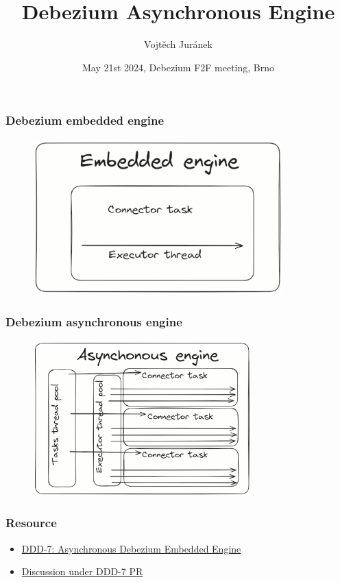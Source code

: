 \documentclass[10pt,utf8]{beamer}
\title{Debezium Asynchronous Engine}
\author{Vojtěch Juránek}
\institute[Red Hat]{Red Hat}
\date{May 21st 2024, Debezium F2F meeting, Brno}
\begin{document}
\begin{frame}
    \titlepage
\end{frame}

\begin{frame}
    \frametitle{Debezium embedded engine}
    \begin{figure}
        \centering
        \includegraphics[height=6cm]{./img/embedded_engine.eps}
    \end{figure}
\end{frame}

\begin{frame}
    \frametitle{Debezium asynchronous engine}
    \begin{figure}
        \centering
        \includegraphics[height=6cm]{./img/async_engine.eps}
    \end{figure}
\end{frame}

\begin{frame}
    \frametitle{Resource}
    \begin{itemize}
        \color{blue}
        \item \href{https://github.com/debezium/debezium-design-documents/blob/main/DDD-7.md}{DDD-7: Asynchronous Debezium Embedded Engine}
        \item \href{https://github.com/debezium/debezium-design-documents/pull/8}{Discussion under DDD-7 PR}
        \color{black}
    \end{itemize}
\end{frame}



\end{document}
